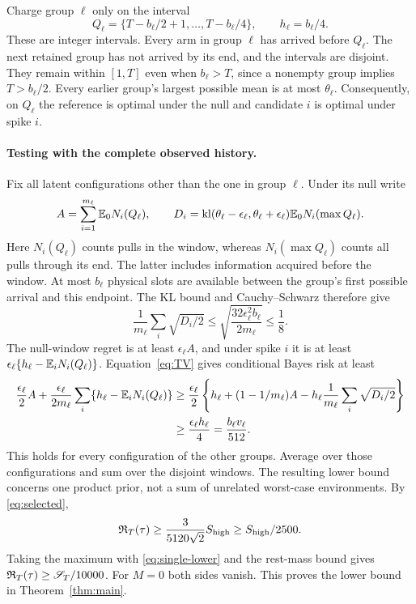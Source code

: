 Charge group $\ell$ only on the interval
\begin{equation}\label{eq:testing-window}
 Q_\ell=\{T-b_\ell/2+1,\ldots,T-b_\ell/4\},
 \qquad h_\ell=b_\ell/4.
\end{equation}
These are integer intervals. Every arm in group $\ell$ has arrived before $Q_\ell$. The next retained group has not arrived by its end, and the intervals are disjoint. They remain within $[1,T]$ even when $b_\ell>T$, since a nonempty group implies $T>b_\ell/2$. Every earlier group's largest possible mean is at most $\theta_\ell$. Consequently, on $Q_\ell$ the reference is optimal under the null and candidate $i$ is optimal under spike $i$.

\paragraph{Testing with the complete observed history.}
Fix all latent configurations other than the one in group $\ell$. Under its null write
\[
 A=\sum_{i=1}^{m_\ell}\mathbb E_0N_i(Q_\ell),\qquad
 D_i=\operatorname{kl}(\theta_\ell-\epsilon_\ell,\theta_\ell+\epsilon_\ell)
       \mathbb E_0N_i(\max Q_\ell).
\]
Here $N_i(Q_\ell)$ counts pulls in the window, whereas $N_i(\max Q_\ell)$ counts all pulls through its end. The latter includes information acquired before the window. At most $b_\ell$ physical slots are available between the group's first possible arrival and this endpoint. The KL bound and Cauchy--Schwarz therefore give
\begin{equation}\label{eq:average-TV}
 \frac1{m_\ell}\sum_i\sqrt{D_i/2}
 \le\sqrt{\frac{32\epsilon_\ell^2b_\ell}{2m_\ell}}\le\frac18.
\end{equation}
The null-window regret is at least $\epsilon_\ell A$, and under spike $i$ it is at least $\epsilon_\ell\{h_\ell-\mathbb E_iN_i(Q_\ell)\}$. Equation~\eqref{eq:TV} gives conditional Bayes risk at least
\begin{align*}
 \frac{\epsilon_\ell}2 A+
 \frac{\epsilon_\ell}{2m_\ell}\sum_i\{h_\ell-\mathbb E_iN_i(Q_\ell)\}
 &\ge\frac{\epsilon_\ell}2
 \left\{h_\ell+(1-1/m_\ell)A-
 h_\ell\frac1{m_\ell}\sum_i\sqrt{D_i/2}\right\}\\
 &\ge\frac{\epsilon_\ell h_\ell}4
 =\frac{b_\ell v_\ell}{512}.
\end{align*}
This holds for every configuration of the other groups. Average over those configurations and sum over the disjoint windows. The resulting lower bound concerns one product prior, not a sum of unrelated worst-case environments. By \eqref{eq:selected},
\[
 \mathfrak R_T(\tau)\ge\frac{3}{5120\sqrt2}S_{\mathrm{high}}
 \ge S_{\mathrm{high}}/2500.
\]
Taking the maximum with \eqref{eq:single-lower} and the rest-mass bound gives $\mathfrak R_T(\tau)\ge\mathscr S_T/10000$. For $M=0$ both sides vanish. This proves the lower bound in Theorem~\ref{thm:main}.

